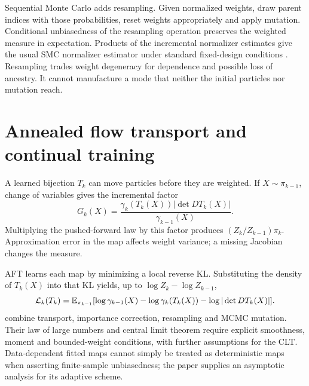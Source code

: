 Sequential Monte Carlo adds resampling. Given normalized weights, draw parent
indices with those probabilities, reset weights appropriately and apply
mutation. Conditional unbiasedness of the resampling operation preserves the
weighted measure in expectation. Products of the incremental normalizer
estimates give the usual SMC normalizer estimator under standard fixed-design
conditions \citep{chopin2020introduction}. Resampling trades weight degeneracy
for dependence and possible loss of ancestry. It cannot manufacture a mode that
neither the initial particles nor mutation reach.

\section{Annealed flow transport and continual training}

A learned bijection $T_k$ can move particles before they are weighted. If
$X\sim\pi_{k-1}$, change of variables gives the incremental factor
\begin{equation}
 G_k(X)=\frac{\gamma_k(T_k(X))|\det DT_k(X)|}
                    {\gamma_{k-1}(X)}.
 \label{eq:bf-is-aft-weight}
\end{equation}
Multiplying the pushed-forward law by this factor produces
$(Z_k/Z_{k-1})\pi_k$. Approximation error in the map affects weight variance;
a missing Jacobian changes the measure.

AFT learns each map by minimizing a local reverse KL. Substituting the density
of $T_k(X)$ into that KL yields, up to $\log Z_k-\log Z_{k-1}$,
\begin{equation}
 \mathcal L_k(T_k)=\mathbb{E}_{\pi_{k-1}}
 [\log\gamma_{k-1}(X)-\log\gamma_k(T_k(X))
                          -\log|\det DT_k(X)|].
 \label{eq:bf-is-aft-loss}
\end{equation}
\citet[Equations 7--9 and Algorithm 1]{arbel2021aft} combine transport,
importance correction, resampling and MCMC mutation. Their law of large numbers
and central limit theorem require explicit smoothness, moment and bounded-weight
conditions, with further assumptions for the CLT. Data-dependent fitted maps
cannot simply be treated as deterministic maps when asserting finite-sample
unbiasedness; the paper supplies an asymptotic analysis for its adaptive scheme.

